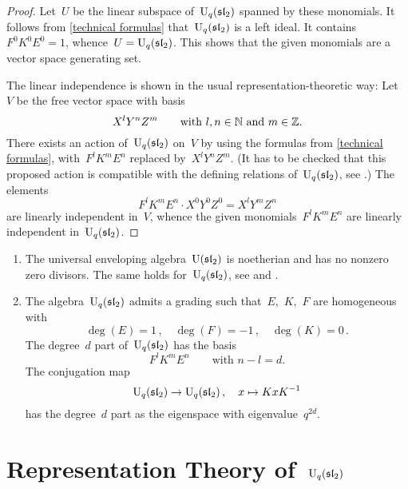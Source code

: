 \documentclass[a4paper, 11pt, oneside]{scrartcl}
\begin{document}
\begin{proof}
  Let~$U$ be the linear subspace of~$\operatorname{U}_q(\mathfrak{sl}_2)$ spanned by these monomials.
  It follows from \cref{technical formulas} that~$\operatorname{U}_q(\mathfrak{sl}_2)$ is a left ideal.
  It contains~$F^0 K^0 E^0 = 1$, whence~$U = \operatorname{U}_q(\mathfrak{sl}_2)$.
  This shows that the given monomials are a vector space generating set.

  The linear independence is shown in the usual representation-theoretic way:
  Let~$V$ be the free vector space with basis
  \[
    X^l Y^n Z^m
    \qquad
    \text{with~$l, n \in \mathbb{N}$ and~$m \in \mathbb{Z}$}.
  \]
  There exists an action of~$\operatorname{U}_q(\mathfrak{sl}_2)$ on~$V$ by using the formulas from \cref{technical formulas}, with~$F^l K^m E^n$ replaced by~$X^l Y^n Z^m$.
  (It has to be checked that this proposed action is compatible with the defining relations of~$\operatorname{U}_q(\mathfrak{sl}_2)$, see \cite[Appendix 1.5]{jantzen_quantum}.)
  The elements
  \[
    F^l K^m E^n \cdot X^0 Y^0 Z^0
    =
    X^l Y^m Z^n
  \]
  are linearly independent in~$V$, whence the given monomials~$F^l K^m E^n$ are linearly independent in~$\operatorname{U}_q(\mathfrak{sl}_2)$.
\end{proof}

\begin{remark}
  \leavevmode
  \begin{enumerate}
    \item
      The universal enveloping algebra~$\operatorname{U}(\mathfrak{sl}_2)$ is noetherian and has no nonzero zero divisors.
      The same holds for~$\operatorname{U}_q(\mathfrak{sl}_2)$, see \cite[Proposition~VI.1.4]{kassel_quantum} and \cite[Propositon~1.8]{jantzen_quantum}.
    \item
      The algebra~$\operatorname{U}_q(\mathfrak{sl}_2)$ admits a grading such that~$E$,~$K$,~$F$ are homogeneous with
      \[
        \deg(E) = 1 \,,
        \quad
        \deg(F) = -1 \,,
        \quad
        \deg(K) = 0 \,.
      \]
      The degree~$d$ part of~$\operatorname{U}_q(\mathfrak{sl}_2)$ has the basis
      \[
        F^l K^m E^n
        \qquad
        \text{with~$n - l = d$.}
      \]
      The conjugation map
      \[
        \operatorname{U}_q(\mathfrak{sl}_2)
        \to
        \operatorname{U}_q(\mathfrak{sl}_2) \,,
        \quad
        x
        \mapsto
        K x K^{-1}
      \]
      has the degree~$d$ part as the eigenspace with eigenvalue~$q^{2d}$.
  \end{enumerate}
\end{remark}





\section{Representation Theory of~$\operatorname{U}_q(\mathfrak{sl}_2)$}
\end{document}
